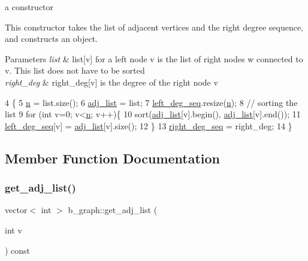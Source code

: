 a constructor 

This constructor takes the list of adjacent vertices and the right degree sequence, and constructs an object. 
\begin{DoxyParams}{Parameters}
{\em list} & list\mbox{[}v\mbox{]} for a left node v is the list of right nodes w connected to v. This list does not have to be sorted \\
\hline
{\em right\+\_\+deg} & right\+\_\+deg\mbox{[}v\mbox{]} is the degree of the right node v \\
\hline
\end{DoxyParams}

\begin{DoxyCode}
4 \{
5   \hyperlink{classb__graph_a9e211d40c1799bc9b125de472ff06642}{n} = list.size();
6   \hyperlink{classb__graph_a2a89d2e8f958270952aab2e8769b7342}{adj\_list} = list;
7   \hyperlink{classb__graph_a311d16462dbb10c47b3a6c80a42139d9}{left\_deg\_seq}.resize(\hyperlink{classb__graph_a9e211d40c1799bc9b125de472ff06642}{n});
8   \textcolor{comment}{// sorting the list}
9   \textcolor{keywordflow}{for} (\textcolor{keywordtype}{int} v=0; v<\hyperlink{classb__graph_a9e211d40c1799bc9b125de472ff06642}{n}; v++)\{
10     sort(\hyperlink{classb__graph_a2a89d2e8f958270952aab2e8769b7342}{adj\_list}[v].begin(), \hyperlink{classb__graph_a2a89d2e8f958270952aab2e8769b7342}{adj\_list}[v].end());
11     \hyperlink{classb__graph_a311d16462dbb10c47b3a6c80a42139d9}{left\_deg\_seq}[v] = \hyperlink{classb__graph_a2a89d2e8f958270952aab2e8769b7342}{adj\_list}[v].size();
12   \}
13   \hyperlink{classb__graph_ae4c875ed6a583a78f38dfe958f20fad5}{right\_deg\_seq} = right\_deg;
14 \}
\end{DoxyCode}


\subsection{Member Function Documentation}
\mbox{\label{classb__graph_aa81c7179b9c6cb4986c4b41e84a85799}} 
\subsubsection{\texorpdfstring{get\+\_\+adj\+\_\+list()}{get\_adj\_list()}}
{\footnotesize\ttfamily vector$<$ int $>$ b\+\_\+graph\+::get\+\_\+adj\+\_\+list (\begin{DoxyParamCaption}\item[{int}]{v }\end{DoxyParamCaption}) const}



